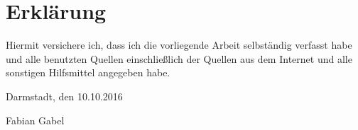 \thispagestyle{empty}

\vspace*{4cm}
\section*{Erklärung}

Hiermit versichere ich, dass ich die vorliegende Arbeit selbständig verfasst habe und alle benutzten Quellen einschließlich der Quellen aus dem Internet und alle sonstigen Hilfsmittel angegeben habe.\vspace{20pt}

\noindent
Darmstadt, den 10.10.2016\vspace{60pt}


\noindent
Fabian Gabel


